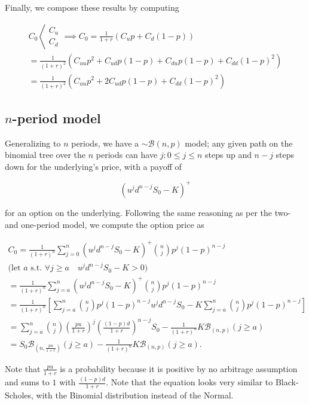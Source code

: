 \documentclass[oneside,titlepage,headinclude,12pt,a4paper,BCOR5mm,footinclude]{book}
\theoremstyle{defn}
\begin{document}
Finally, we compose these results by computing

\begin{gather*}
  C_0 \left\langle
    \begin{array}{l}
      C_u \\
      C_d 
    \end{array} 
  \implies
  C_0 = \frac{1}{1+r} (C_up + C_d(1-p)) \\
  = \frac{1}{(1+r)^2} \left( C_{uu}p^2 + C_{ud}p(1-p) + C_{du}p(1-p) + C_{dd}(1-p)^2 \right) \\
  = \frac{1}{(1+r)^2} \left(C_{uu}p^2 + 2C_{ud}p(1-p) + C_{dd}(1-p)^2 \right)
\end{gather*}

\subsection{$n$-period model}

Generalizing to $n$  periods, we have a  $\sim \mathcal{B}(n,p)$ model; any  given path on
the binomial  tree over  the $n$ periods  can have  $j: 0 \leq  j \leq  n$ steps
up  and  $n-j$  steps  down  for  the  underlying's  price,  with  a  payoff  of

\[ (u^jd^{n-j}S_0 -K)^+ \] 

for an option  on the underlying. Following  the same reasoning as  per the two-
and one-period model, we compute the option price as

\begin{gather*}
  C_0 = \frac{1}{(1+r)^n} \sum_{j=0}^n \left( u^j d^{n-j} S_0 - K \right)^+ \binom{n}{j} p^j(1-p)^{n-j} \\
  \text{(let } a \text{ s.t. } \forall j \geq a \quad u^jd^{n-j}S_0 - K > 0 \text{)} \\
  = \frac{1}{(1+r)^n} \sum_{j=a}^n \left( u^j d^{n-j} S_0 - K \right)^+ \binom{n}{j} p^j(1-p)^{n-j} \\
  = \frac{1}{(1+r)^n} \left[\sum_{j=a}^n \binom{n}{j}p^j(1-p)^{n-j}u^jd^{n-j}S_0 -K\sum_{j=a}^n \binom{n}{j}p^j(1-p)^{n-j}\right] \\
  = \sum_{j=a}^n \binom{n}{j}\left(\frac{pu}{1+r}\right)^j \left(\frac{(1-p)d}{1+r}\right)^{n-j}S_0 - \frac{1}{(1+r)^n}K\mathcal{B}_{(n,p)}(j\geq a) \\
  = S_0 \mathcal{B}_{\left(n, \frac{pu}{1+r}\right)}(j \geq a)- \frac{1}{(1+r)^n}K\mathcal{B}_{(n,p)}(j\geq a).
\end{gather*}

Note  that $\frac{pu}{1+r}$  is  a  probability because  it  is  positive by  no
arbitrage assumption  and sums to  $1$ with $\frac{(1-p)d}{1+r}$. Note  that the
equation looks  very similar  to Black-Scholes,  with the  Binomial distribution
instead of the Normal.
\end{document}
